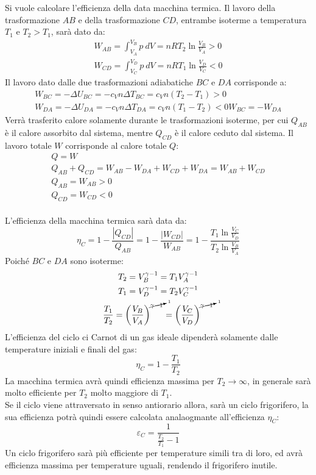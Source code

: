 \documentclass{article}
\numberwithin{equation}{subsection}
\begin{document}
Si vuole calcolare l'efficienza della data macchina termica. Il 
lavoro della trasformazione $AB$ e della trasformazione $CD$, entrambe isoterme a temperatura $T_1$ e $T_2>T_1$, sarà dato da: 
\begin{gather*}
    W_{AB}=\int_{V_A}^{V_B}p\:dV=nRT_2\ln\displaystyle\frac{V_B}{V_A}>0\\
    W_{CD}=\int_{V_C}^{V_D}p\:dV=nRT_1\ln\displaystyle\frac{V_D}{V_C}<0
\end{gather*}
Il lavoro dato dalle due trasformazioni adiabatiche $BC$ e $DA$ corrisponde a:
\begin{gather*}
    W_{BC}=-\Delta U_{BC}=-c_Vn\Delta T_{BC}=c_Vn(T_2-T_1)>0\\
    W_{DA}=-\Delta U_{DA}=-c_Vn\Delta T_{DA}=c_Vn(T_1-T_2)<0
    W_{BC}=-W_{DA}
\end{gather*}
Verrà trasferito calore solamente durante le trasformazioni isoterme, per cui 
$Q_{AB}$ è il calore assorbito dal sistema, mentre $Q_{CD}$ è il calore 
ceduto dal sistema. Il lavoro totale $W$ corrisponde al calore totale $Q$:
\begin{gather*}
    Q=W\\
    Q_{AB}+Q_{CD}=W_{AB}-W_{DA}+W_{CD}+W_{DA}=W_{AB}+W_{CD}\\
    Q_{AB}=W_{AB}>0\\
    Q_{CD}=W_{CD}<0
\end{gather*}
\\
L'efficienza della macchina termica sarà data da:
\begin{equation*}
    \eta_C=1-\displaystyle\frac{|Q_{CD}|}{Q_{AB}}=1-\frac{|W_{CD}|}{W_{AB}}=1-\frac{T_1\ln\displaystyle\frac{V_C}{V_D}}{T_2\ln\displaystyle\frac{V_B}{V_A}}
\end{equation*}
Poiché $BC$ e $DA$ sono isoterme:
\begin{gather*}
    T_2=V_B^{\gamma-1}=T_1V_A^{\gamma-1}\\
    T_1=V_D^{\gamma-1}=T_2V_C^{\gamma-1}\\
    \displaystyle\frac{T_1}{T_2}=\left(\frac{V_B}{V_A}\right)^{\cancelto{1}{\gamma-1}}=\left(\frac{V_C}{V_D}\right)^{\cancelto{1}{\gamma-1}}
\end{gather*}
L'efficienza del ciclo ci Carnot di un gas ideale dipenderà solamente dalle temperature iniziali e finali del gas:
\begin{equation}
    \eta_C=1-\displaystyle\frac{T_1}{T_2}
\end{equation}
La macchina termica avrà quindi efficienza massima per $T_2\to\infty$, 
in generale sarà molto efficiente per $T_2$ molto maggiore di $T_1$.
\\
Se il ciclo viene attraversato in senso antiorario allora, sarà un ciclo 
frigorifero, la sua efficienza potrà quindi essere calcolata 
analaogmante all'efficienza $\eta_C$:
\begin{equation}
    \varepsilon_C=\displaystyle\frac{1}{\displaystyle\frac{T_2}{T_1}-1}
\end{equation}
Un ciclo frigorifero sarà più efficiente per temperature simili tra di loro, 
ed avrà efficienza massima per temperature uguali, rendendo il frigorifero 
inutile. 
\end{document}
